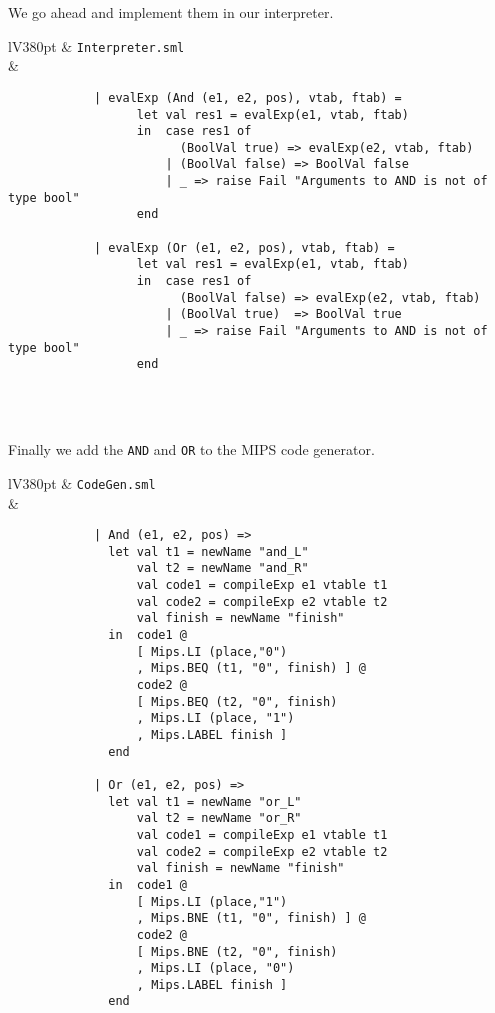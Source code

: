 \documentclass[a4paper]{article}
\begin{document}
We go ahead and implement them in our interpreter.

\begin{center}	
	\begin{tabular}{lV{380pt}}
		\toprule
		& \verb|Interpreter.sml|\\
		\midrule
		&
		\begin{verbatim}
			| evalExp (And (e1, e2, pos), vtab, ftab) =
			      let val res1 = evalExp(e1, vtab, ftab)
			      in  case res1 of
			            (BoolVal true) => evalExp(e2, vtab, ftab)
			          | (BoolVal false) => BoolVal false
			          | _ => raise Fail "Arguments to AND is not of type bool"
			      end
			  
			| evalExp (Or (e1, e2, pos), vtab, ftab) =
			      let val res1 = evalExp(e1, vtab, ftab)
			      in  case res1 of
			            (BoolVal false) => evalExp(e2, vtab, ftab)
			          | (BoolVal true)  => BoolVal true
			          | _ => raise Fail "Arguments to AND is not of type bool"
			      end
		\end{verbatim}
		\\
		\bottomrule \\
	\end{tabular}
\end{center}

Finally we add the \texttt{AND} and \texttt{OR} to the MIPS code generator.

\begin{center}	
	\begin{tabular}{lV{380pt}}
		\toprule
		& \verb|CodeGen.sml|\\
		\midrule
		&
		\begin{verbatim}
			| And (e1, e2, pos) =>
			  let val t1 = newName "and_L"
			      val t2 = newName "and_R"
			      val code1 = compileExp e1 vtable t1
			      val code2 = compileExp e2 vtable t2
			      val finish = newName "finish"
			  in  code1 @
			      [ Mips.LI (place,"0")
			      , Mips.BEQ (t1, "0", finish) ] @
			      code2 @
			      [ Mips.BEQ (t2, "0", finish)
			      , Mips.LI (place, "1")
			      , Mips.LABEL finish ]
			  end
			
			| Or (e1, e2, pos) =>
			  let val t1 = newName "or_L"
			      val t2 = newName "or_R"
			      val code1 = compileExp e1 vtable t1
			      val code2 = compileExp e2 vtable t2
			      val finish = newName "finish"
			  in  code1 @
			      [ Mips.LI (place,"1")
			      , Mips.BNE (t1, "0", finish) ] @
			      code2 @
			      [ Mips.BNE (t2, "0", finish)
			      , Mips.LI (place, "0")
			      , Mips.LABEL finish ]
			  end
		\end{verbatim}
		\\
		\bottomrule \\
	\end{tabular}
\end{center}
\end{document}
